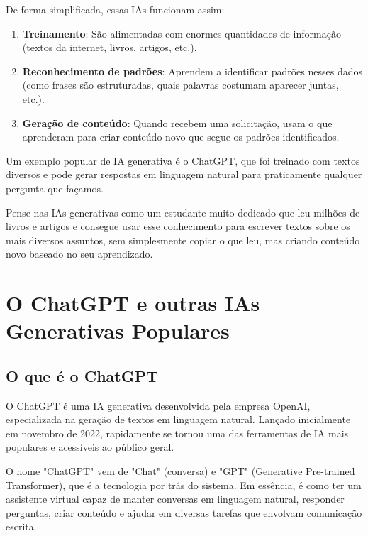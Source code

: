 \documentclass[12pt,a4paper]{book}
\begin{document}
De forma simplificada, essas IAs funcionam assim:

\begin{enumerate}
    \item \textbf{Treinamento}: São alimentadas com enormes quantidades de informação (textos da internet, livros, artigos, etc.).
    \item \textbf{Reconhecimento de padrões}: Aprendem a identificar padrões nesses dados (como frases são estruturadas, quais palavras costumam aparecer juntas, etc.).
    \item \textbf{Geração de conteúdo}: Quando recebem uma solicitação, usam o que aprenderam para criar conteúdo novo que segue os padrões identificados.
\end{enumerate}

Um exemplo popular de IA generativa é o ChatGPT, que foi treinado com textos diversos e pode gerar respostas em linguagem natural para praticamente qualquer pergunta que façamos.

\begin{tcolorbox}[dica]
Pense nas IAs generativas como um estudante muito dedicado que leu milhões de livros e artigos e consegue usar esse conhecimento para escrever textos sobre os mais diversos assuntos, sem simplesmente copiar o que leu, mas criando conteúdo novo baseado no seu aprendizado.
\end{tcolorbox}

\section{O ChatGPT e outras IAs Generativas Populares}

\subsection{O que é o ChatGPT}

O ChatGPT é uma IA generativa desenvolvida pela empresa OpenAI, especializada na geração de textos em linguagem natural. Lançado inicialmente em novembro de 2022, rapidamente se tornou uma das ferramentas de IA mais populares e acessíveis ao público geral.

O nome "ChatGPT" vem de "Chat" (conversa) e "GPT" (Generative Pre-trained Transformer), que é a tecnologia por trás do sistema. Em essência, é como ter um assistente virtual capaz de manter conversas em linguagem natural, responder perguntas, criar conteúdo e ajudar em diversas tarefas que envolvam comunicação escrita.
\end{document}
